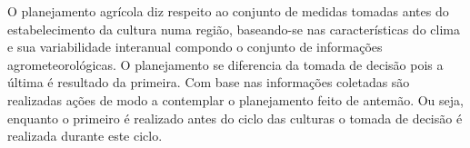 \newpar O planejamento agrícola diz respeito ao conjunto de medidas tomadas antes do estabelecimento da cultura numa região, baseando-se nas características do clima e sua variabilidade interanual compondo o conjunto de informações agrometeorológicas.  O planejamento se diferencia da tomada de decisão pois a última é resultado da primeira. Com base nas informações coletadas são realizadas ações de modo a contemplar o planejamento feito de antemão. Ou seja, enquanto o primeiro é realizado antes do ciclo das culturas o tomada de decisão é realizada durante este ciclo. 